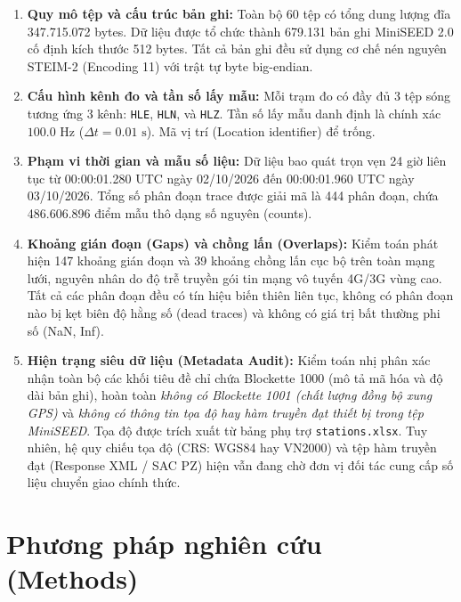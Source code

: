 \documentclass[preprint,1p]{elsarticle}
\begin{document}
\begin{enumerate}
    \item \textbf{Quy mô tệp và cấu trúc bản ghi:} Toàn bộ 60 tệp có tổng dung lượng đĩa 347.715.072 bytes. Dữ liệu được tổ chức thành 679.131 bản ghi MiniSEED 2.0 cố định kích thước 512 bytes. Tất cả bản ghi đều sử dụng cơ chế nén nguyên STEIM-2 (Encoding 11) với trật tự byte big-endian.
    \item \textbf{Cấu hình kênh đo và tần số lấy mẫu:} Mỗi trạm đo có đầy đủ 3 tệp sóng tương ứng 3 kênh: \texttt{HLE}, \texttt{HLN}, và \texttt{HLZ}. Tần số lấy mẫu danh định là chính xác $100.0\text{ Hz}$ ($\Delta t = 0.01\text{ s}$). Mã vị trí (Location identifier) để trống.
    \item \textbf{Phạm vi thời gian và mẫu số liệu:} Dữ liệu bao quát trọn vẹn 24 giờ liên tục từ 00:00:01.280 UTC ngày 02/10/2026 đến 00:00:01.960 UTC ngày 03/10/2026. Tổng số phân đoạn trace được giải mã là 444 phân đoạn, chứa 486.606.896 điểm mẫu thô dạng số nguyên (counts).
    \item \textbf{Khoảng gián đoạn (Gaps) và chồng lấn (Overlaps):} Kiểm toán phát hiện 147 khoảng gián đoạn và 39 khoảng chồng lấn cục bộ trên toàn mạng lưới, nguyên nhân do độ trễ truyền gói tin mạng vô tuyến 4G/3G vùng cao. Tất cả các phân đoạn đều có tín hiệu biến thiên liên tục, không có phân đoạn nào bị kẹt biên độ hằng số (dead traces) và không có giá trị bất thường phi số (NaN, Inf).
    \item \textbf{Hiện trạng siêu dữ liệu (Metadata Audit):} Kiểm toán nhị phân xác nhận toàn bộ các khối tiêu đề chỉ chứa Blockette 1000 (mô tả mã hóa và độ dài bản ghi), hoàn toàn \textit{không có Blockette 1001 (chất lượng đồng bộ xung GPS)} và \textit{không có thông tin tọa độ hay hàm truyền đạt thiết bị trong tệp MiniSEED}. Tọa độ được trích xuất từ bảng phụ trợ \texttt{stations.xlsx}. Tuy nhiên, hệ quy chiếu tọa độ (CRS: WGS84 hay VN2000) và tệp hàm truyền đạt (Response XML / SAC PZ) hiện vẫn đang chờ đơn vị đối tác cung cấp số liệu chuyển giao chính thức.
\end{enumerate}

\section{Phương pháp nghiên cứu (Methods)}
\label{sec:methods}
\end{document}
